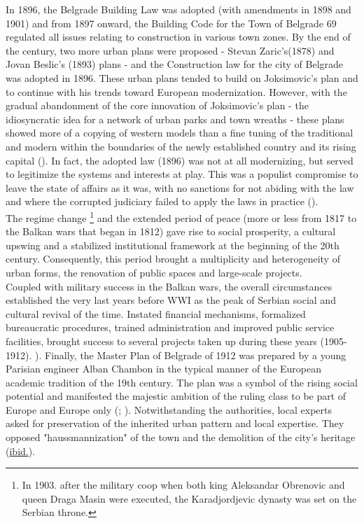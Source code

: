 \documentclass[11pt]{report}
\begin{document}
In 1896, the Belgrade Building Law was adopted (with amendments in 1898 and 1901) and from 1897 onward, the Building Code for the Town of Belgrade 69 regulated all issues relating to construction in various town zones.
By the end of the century, two more urban plans were proposed - Stevan Zaric’s(1878) and Jovan Beslic’s (1893) plans - and the Construction law for the city of Belgrade was adopted in 1896. These urban plans tended to build on Joksimovic’s plan and to continue with his trends toward European modernization.  However, with the gradual abandonment of the core innovation of Joksimovic’s plan - the idiosyncratic idea for a network of urban parks and town wreaths -	these plans showed more of a copying of western models than a fine tuning of the traditional and modern within the boundaries of the newly established country and its rising capital  (\href{Blagojevic}{\citealt{blagojevic_urban_2009}}). In fact, the adopted law (1896) was not at all modernizing, but served to legitimize the systems and interests at play.  This was a populist compromise to leave the state of affairs as it was, with no sanctions for not abiding with the law and where the corrupted judiciary failed to apply the laws in practice (\href{Stojanovic}{\citealt{dubravka_stojanovic_kontroverze_2015}}). 
\\

The regime change
\footnote{In 1903. after the military coop when both king Aleksandar Obrenovic and queen Draga Masin were executed, the Karadjordjevic dynasty was set on the Serbian throne.}
and the extended period of peace (more or less from 1817  to the Balkan wars that began in 1812)  gave rise to social prosperity, a cultural upswing and a stabilized institutional framework at the beginning of the 20th century.   Consequently, this period brought a multiplicity and heterogeneity of urban forms, the renovation of public spaces and large-scale projects.
\\

Coupled with military success in the Balkan wars, the overall circumstances established the very  last  years  before  WWI  as the  peak  of  Serbian  social  and  cultural  revival  of  the  time. Instated  financial   mechanisms,   formalized  bureaucratic  procedures,   trained  administration  and  improved  public  service  facilities,  brought  success  to  several  projects  taken  up during  these  years  (1905-1912).
).   Finally,  the  Master  Plan  of  Belgrade of 1912  was  prepared  by  a  young  Parisian  engineer  Alban  Chambon  in  the  typical  manner of  the  European  academic  tradition  of  the  19th  century.   The  plan  was  a  symbol  of  the rising social potential and manifested the majestic ambition of the ruling class to be part  of  Europe  and  Europe  only   
(\href{Blagojevic}{\citealt{blagojevic_urban_2009}}; \href{Doytchinov}{\citealt{doytchinov_modernization_2015}}).
Notwithstanding the authorities, local experts asked for preservation of the inherited urban pattern and local expertise. They opposed "haussmannization" of the town and the demolition of the city's heritage (\href{ref}{ibid.}).
\\
\end{document}
